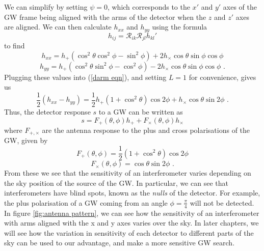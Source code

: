\documentclass[11pt]{cuthesis}
\newcommand{\fs}{\text{ .}}
\begin{document}
We can simplify by setting $\psi=0$, which corresponds to the $x'$ and $y'$ axes of the GW frame being aligned with the arms of the detector when the $z$ and $z'$ axes are aligned. We can then calculate $h_{xx}$ and $h_{yy}$ using the formula
\begin{equation}
h_{ij} = \mathcal{R}_{ik} \mathcal{R}_{jl} h_{kl}'
\end{equation}
to find
\begin{equation}
h_{xx} = h_+(\cos^2 \theta \cos^2 \phi - \sin^2 \phi) + 2h_\times \cos \theta \sin\phi \cos\phi
\end{equation}
\begin{equation}
h_{yy} = h_+(\cos^2 \theta \sin^2 \phi - \cos^2 \phi) - 2h_\times \cos \theta \sin\phi \cos\phi \fs
\end{equation}
Plugging these values into (\ref{darm eqn}), and setting $L=1$ for convenience, gives us
\begin{equation}
\frac{1}{2} (h_{xx} - h_{yy}) = \frac{1}{2} h_+ (1+\cos^2\theta)\cos 2\phi + h_\times \cos \theta \sin 2\phi \fs
\end{equation}
Thus, the detector response $s$ to a GW can be written as
\begin{equation}
s = F_+(\theta,\phi)h_+ + F_\times(\theta,\phi) h_\times
\end{equation}
where $F_{+,\times}$ are the antenna response to the plus and cross polarisations of the GW, given by
\begin{equation}
F_+(\theta,\phi) = \frac{1}{2} (1+\cos^2\theta)\cos 2\phi
\end{equation}
\begin{equation}
F_\times(\theta,\phi) = \cos \theta \sin 2\phi \fs
\end{equation}
From these we see that the sensitivity of an interferometer varies depending on the sky position of the source of the GW. In particular, we can see that interferometers have blind spots, known as the \textit{nulls} of the detector. For example, the plus polarisation of a GW coming from an angle $\phi=\frac{\pi}{4}$ will not be detected. In figure \ref{fig:antenna pattern}, we can see how the sensitivity of an interferometer with arms aligned with the x and y axes varies over the sky. In later chapters, we will see how the variation in sensitivity of each detector to different parts of the sky can be used to our advantage, and make a more sensitive GW search.
\end{document}
